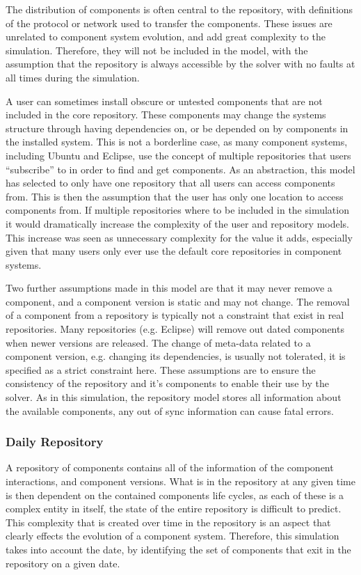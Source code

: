 The distribution of components is often central to the repository, 
with definitions of the protocol or network used to transfer the components.
These issues are unrelated to component system evolution, and add great complexity to the simulation.
Therefore, they will not be included in the model, with the assumption that the repository is always accessible by the solver with no faults at all times during the simulation.

A user can sometimes install obscure or untested components that are not included in the core repository.
These components may change the systems structure through having dependencies on, or be depended on by components in the installed system.
This is not a borderline case, as many component systems, including Ubuntu and Eclipse, use the concept of multiple repositories that users ``subscribe'' to in order to find and get components.
As an abstraction, this model has selected to only have one repository that all users can access components from.
This is then the assumption that the user has only one location to access components from.
If multiple repositories where to be included in the simulation it would dramatically increase the complexity of the user and repository models.
This increase was seen as unnecessary complexity for the value it adds, especially given that many users only ever use the default core repositories in component systems.

Two further assumptions made in this model are that it may never remove a component, and a component version is static and may not change.
The removal of a component from a repository is typically not a constraint that exist in real repositories.
Many repositories (e.g. Eclipse) will remove out dated components when newer versions are released.
The change of meta-data related to a component version, e.g. changing its dependencies, is usually not tolerated, it is specified as a strict constraint here.
These assumptions are to ensure the consistency of the repository and it's components to enable their use by the solver. 
As in this simulation, the repository model stores all information about the available components, any out of sync information can cause fatal errors.

\subsubsection{Daily Repository}
A repository of components contains all of the information of the component interactions, and component versions.
What is in the repository at any given time is then dependent on the contained components life cycles,
as each of these is a complex entity in itself, the state of the entire repository is difficult to predict.
This complexity that is created over time in the repository is an aspect that clearly effects the evolution of a component system.
Therefore, this simulation takes into account the date, by identifying the set of components that exit in the repository on a given date.

